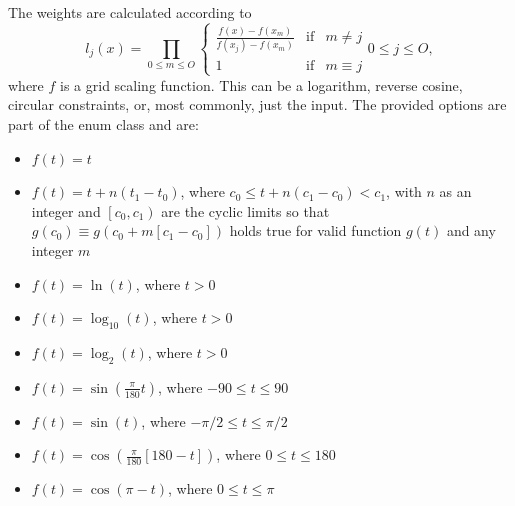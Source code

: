 The weights are calculated according to 
\begin{equation}
 l_j(x) = \prod_{0 \leq m \leq O} \left\{
 \begin{array}{lcr}
 \frac{f(x) - f(x _m)}{f(x_j) - f(x_m)} & \mathrm{if} & m \neq j \\[5pt]
 1 & \mathrm{if} & m \equiv j
 \end{array}
 \right. 0 \leq j \leq O, 
\end{equation}
where $f$ is a grid scaling function.  This can be a logarithm, reverse cosine,
circular constraints, or, most commonly, just the input.  The provided options
are part of the  enum class and are:
\begin{itemize}
 \item[\shortcode{Standard}] $f\left(t\right) = t$
 \item[\shortcode{Cyclic}] $f\left(t\right) = t + n\left(t_1 - t_0\right)$,
                           where $c_0 \leq t + n\left(c_1 - c_0\right) < c_1$,
                           with $n$ as an integer and $\left[c_0, c_1\right)$
                           are the cyclic limits so that
                           $g\left(c_0\right) \equiv g\left(c_0 + m\left[c_1-c_0\right]\right)$
                           holds true for valid function $g(t)$ and any integer $m$
 \item[\shortcode{Log}] $f\left(t\right) = \ln\left(t\right)$, where $t > 0$
 \item[\shortcode{Log10}] $f\left(t\right) = \log_{10}\left(t\right)$, where $t > 0$
 \item[\shortcode{Log2}] $f\left(t\right) = \log_2\left(t\right)$, where $t > 0$
 \item[\shortcode{SinDeg}] $f\left(t\right) = \sin\left(\frac{\pi}{180}t\right)$, where $-90\leq t \leq 90$
 \item[\shortcode{SinRad}] $f\left(t\right) = \sin\left(t\right)$, where $-\pi/2 \leq t \leq \pi/2$
 \item[\shortcode{CosDeg}] $f\left(t\right) = \cos\left(\frac{\pi}{180}\left[180 - t\right]\right)$, where $0\leq t \leq 180$
 \item[\shortcode{CosRad}] $f\left(t\right) = \cos\left(\pi-t\right)$, where $0 \leq t \leq \pi$
\end{itemize}

